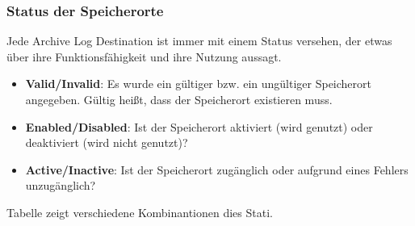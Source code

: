         \subsubsection{Status der Speicherorte}
          Jede Archive Log Destination ist immer mit einem Status versehen, der etwas \"uber ihre Funktionsf\"ahigkeit und ihre Nutzung aussagt.
        \begin{itemize}
          \item \textbf{Valid/Invalid}: Es wurde ein g\"ultiger bzw. ein ung\"ultiger Speicherort angegeben. G\"ultig hei\ss t, dass der Speicherort existieren muss.
          \item \textbf{Enabled/Disabled}: Ist der Speicherort aktiviert (wird genutzt) oder deaktiviert (wird nicht genutzt)?
          \item \textbf{Active/Inactive}: Ist der Speicherort zug\"anglich oder aufgrund eines Fehlers unzug\"anglich?
        \end{itemize}
        Tabelle  zeigt verschiedene Kombinantionen
        dies Stati.
